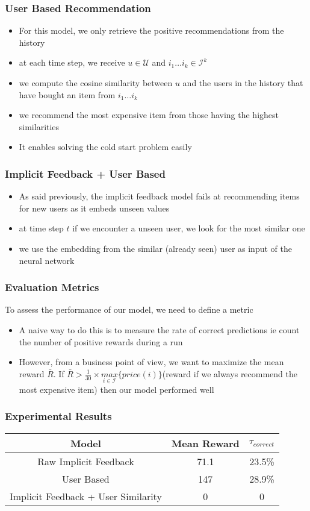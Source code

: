 \documentclass{beamer}
\begin{document}
\begin{frame}
	\frametitle{User Based Recommendation}
	\begin{itemize}
	\item For this model, we only retrieve the positive recommendations from the history
	\item at each time step, we receive $u\in \mathcal{U}$ and $i_1 \dots i_k \in \mathcal{I}^k$
	\item we compute the cosine similarity between $u$ and the users in the history that have bought an item from $i_1 \dots i_k$
	\item we recommend the most expensive item from those having the highest similarities
	\item It enables solving the cold start problem easily
	\end{itemize}
\end{frame}

\begin{frame}
	\frametitle{Implicit Feedback + User Based}
	\begin{itemize}
	\item As said previously, the implicit feedback model fails at recommending items for new users as it embeds unseen values
	\item at time step $t$ if we encounter a unseen user, we look for the most similar one
	\item we use the embedding from the similar (already seen) user as input of the neural network
	\end{itemize}
\end{frame}

\begin{frame}
	\frametitle{Evaluation Metrics}
	To assess the performance of our model, we need to define a metric
	\begin{itemize}
		\item A naive way to do this is to measure the rate of correct predictions ie count the number of positive rewards during a run
		\item However, from a business point of view, we want to maximize the mean reward $\bar{R}$. If 
		$\bar{R} > \frac{1}{30}\times \underset{i \in \mathcal{I}}{max}\lbrace price(i)\rbrace$(reward if we always recommend the most expensive item) then our model performed well 
	\end{itemize}
\end{frame}

\begin{frame}
	\frametitle{Experimental Results}
	
	\begin{tabular}{c ||c|c}
		Model & Mean Reward & $\tau_{correct}$ \\
		\hline
		Raw Implicit Feedback & 71.1 & 23.5\% \\
		User Based & 147 & 28.9\% \\
		Implicit Feedback + User Similarity & 0 & 0 \\
	\end{tabular}
\end{frame}
\end{document}
